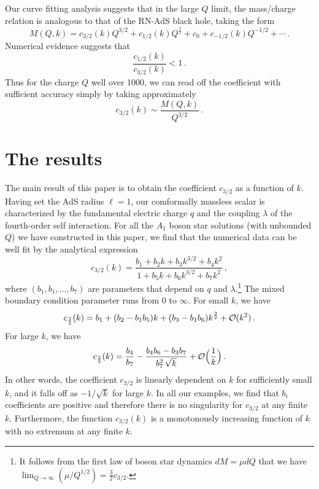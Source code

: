 \documentclass[11pt]{article}
\newcommand{\be}{\begin{equation}}
\newcommand{\ee}{\end{equation}}
\def\fft#1#2{{\frac{#1}{#2}}}
\begin{document}
Our curve fitting analysis suggests that in the large $Q$ limit, the mass/charge relation is analogous to that of the RN-AdS black hole, taking the form
\be
M(Q,k) = c_{3/2}(k) Q^{3/2} + c_{1/2}(k) Q^{\fft12} + c_0 + c_{-1/2}(k) Q^{-1/2} + \cdots\,.
\ee
Numerical evidence suggests that
\be
\fft{c_{1/2}(k)}{c_{3/2}(k)}<1\,.
\ee
Thus for the charge $Q$ well over 1000, we can read off the coefficient with sufficient accuracy simply by taking approximately
\be
c_{3/2}(k) \sim \fft{M(Q,k)}{Q^{3/2}}\,.
\ee

\section{The results}

The main result of this paper is to obtain the coefficient $c_{3/2}$ as a function of $k$.  Having set the AdS radius $\ell=1$, our comformally massless scalar is characterized by the fundamental electric charge $q$ and the coupling $\lambda$ of the fourth-order self interaction.  For all the $A_1$ boson star solutions (with unbounded $Q$) we have constructed in this paper, we find that the numerical data can be well fit by the analytical expression
\be
c_{3/2}(k) = \fft{b_1 + b_2 k + b_3 k^{3/2} + b_4 k^2}{1 + b_5 k + b_6 k^{3/2} + b_7 k^2}\,,\label{ckgenfun}
\ee
where $(b_1, b_1, \ldots, b_7)$ are parameters that depend on $q$ and $\lambda$.\footnote{It follows from the first law of boson star dynamics $dM=\mu dQ$ \cite{Liu:2020uaz} that we have $\lim_{Q\rightarrow\infty} (\mu /Q^{1/2})=\fft32 c_{3/2}$.} The mixed boundary condition parameter runs from 0 to $\infty$. For small $k$, we have
\be
c_{\fft32}(k) = b_1 + (b_2 -b_1 b_5) k + (b_3 - b_1 b_6) k^{\fft32} + {\cal O}(k^2)\,.\label{smallk0}
\ee
For large $k$, we have
\be
c_{\fft32}(k) = \fft{b_4}{b_7} - \fft{b_4 b_6 - b_3 b_7}{b_7^2\,\sqrt{k}} + {\cal O}\Big({\fft1{k}}\Big)\,.\label{largek0}
\ee
In other words, the coefficient $c_{3/2}$ is linearly dependent on $k$ for sufficiently small $k$, and it falls off as $-1/\sqrt{k}$ for large $k$.  In all our examples, we find that $b_i$ coefficients are positive and therefore there is no singularity for $c_{3/2}$ at any finite $k$.  Furthermore, the function $c_{3/2}(k)$ is a monotonously increasing function of $k$ with no extremum at any finite $k$.
\end{document}
